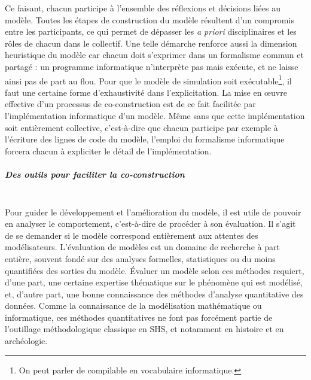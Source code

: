 Ce faisant, chacun participe à l'ensemble des réflexions et décisions liées au modèle.
Toutes les étapes de construction du modèle résultent d'un compromis entre les participants, ce qui permet de dépasser les \textit{a priori} disciplinaires et les \og rôles\fg{} de chacun dans le collectif.
Une telle démarche renforce aussi la dimension heuristique du modèle car chacun doit s'exprimer dans un formalisme commun et partagé :
	un programme informatique n'interprète pas mais exécute, et ne laisse ainsi pas de part au flou.
Pour que le modèle de simulation soit exécutable\footnote{
	On peut parler de \og compilable\fg{} en vocabulaire informatique.
}, il faut une certaine forme d'exhaustivité dans l'explicitation.
La mise en œuvre effective d'un processus de co-construction est de ce fait facilitée par l'implémentation informatique d'un modèle.
Même sans que cette implémentation soit entièrement collective, c'est-à-dire que chacun participe par exemple à l'écriture des lignes de code du modèle, l'emploi du formalisme informatique forcera chacun à expliciter le détail de l'implémentation.

\subparagraph{Des outils pour faciliter la co-construction}\mbox{}\\
Pour guider le développement et l'amélioration du modèle, il est utile de pouvoir en analyser le comportement, c'est-à-dire de procéder à son évaluation.
Il s'agit de se demander si le modèle correspond entièrement aux attentes des modélisateurs.
L'évaluation de modèles est un domaine de recherche à part entière, souvent fondé sur des analyses formelles, statistiques ou du moins quantifiées des sorties du modèle. 
Évaluer un modèle selon ces méthodes requiert, d'une part, une certaine expertise thématique sur le phénomène qui est modélisé, et, d'autre part, une bonne connaissance des méthodes d'analyse quantitative des données.
Comme la connaissance de la modélisation mathématique ou informatique, ces méthodes quantitatives ne font pas forcément partie de l'outillage méthodologique classique en SHS, et notamment en histoire et en archéologie.


